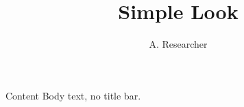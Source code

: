 \documentclass{beamer}
\title{Simple Look}
\author{A. Researcher}
\begin{document}
{
\begin{frame}[plain]\titlepage\end{frame}
}
\begin{frame}{Content}
Body text, no title bar.
\end{frame}
\end{document}
